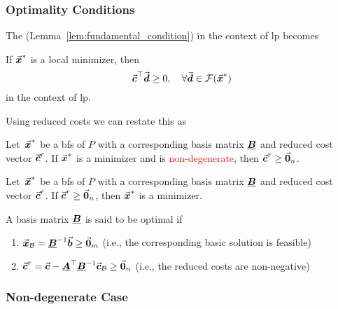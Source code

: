 \subsubsection{Optimality Conditions}
The  (Lemma~\ref{lem:fundamental_condition}) in the context of \gls{lp} becomes
\begin{theorem}\label{thm:fundamental_condition_lp} 
If \(\vec{\boldsymbol{x}}^\ast\) is a local minimizer, then
\[
\vec{\boldsymbol{c}}^\top \vec{\boldsymbol{d}} \ge 0,\quad\forall\vec{\boldsymbol{d}}\in \mathcal{F}(\vec{\boldsymbol{x}}^\ast)
\]
in the context of \gls{lp}.
\end{theorem}


Using reduced costs we can restate this as

\begin{theorem}\label{thm:necessary_optimality_lp}
Let~\(\vec{\boldsymbol{x}}^\ast\) be a \gls{bfs} of \(P\) with a corresponding basis matrix \(\underline{\boldsymbol{B}}\) and reduced cost vector \(\vec{\boldsymbol{c}}^r\).  
If \(\vec{\boldsymbol{x}}^\ast\) is a minimizer and is \textcolor{red}{non-degenerate}, then 
\(
\vec{\boldsymbol{c}}^r \ge \vec{\boldsymbol{0}}_n
\).
\end{theorem}

\begin{theorem}\label{thm:sufficient_optimality_lp}
Let~\(\vec{\boldsymbol{x}}^\ast\) be a \gls{bfs} of \(P\) with a corresponding basis matrix \(\underline{\boldsymbol{B}}\) and reduced cost vector \(\vec{\boldsymbol{c}}^r\).  
If
\(
\vec{\boldsymbol{c}}^r \ge \vec{\boldsymbol{0}}_n
\),
then \(\vec{\boldsymbol{x}}^\ast\) is a minimizer.
\end{theorem}

A basis matrix \(\underline{\boldsymbol{B}}\) is said to be optimal if
\begin{enumerate}
\item \(\vec{\boldsymbol{x}}_\mathcal{B} = \underline{\boldsymbol{B}}^{-1}\vec{\boldsymbol{b}} \ge \vec{\boldsymbol{0}}_m\) (i.e., the corresponding basic solution is feasible)
\item \(\vec{\boldsymbol{c}}^r = \vec{\boldsymbol{c}} - \underline{\boldsymbol{A}}^{\top}\underline{\boldsymbol{B}}^{-1}\vec{\boldsymbol{c}}_\mathcal{B} \ge \vec{\boldsymbol{0}}_n\) (i.e., the reduced costs are non-negative)
\end{enumerate}




\subsubsection{Non-degenerate Case}
\label{subsec:simplex_non_deg}


